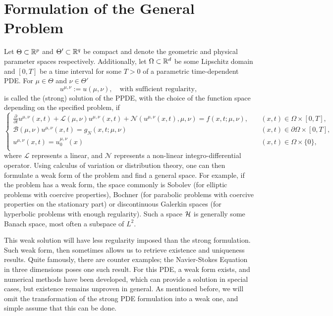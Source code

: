 \chapter{Formulation of the General Problem} \label{chapter: problem}


Let $\Theta \subset \mathbb{R}^{p}$ and $\Theta' \subset \mathbb{R}^q$ be compact and denote the geometric and physical parameter spaces 
respectively. 
Additionally, let $\Omega \subset \mathbb{R}^d$ be some Lipschitz domain and $[0, T]$ be a time interval
for some $T > 0$ of a parametric time-dependent PDE.
For $\mu \in \Theta$ and $\nu \in \Theta'$
\begin{equation*}
    u^{\mu, \nu} := u(\mu, \nu), \quad \text{with sufficient regularity},
\end{equation*}
is called the (strong) solution of the PPDE, with the choice of the function space depending on the
specified problem, if
\begin{equation*}\begin{cases}
    \displaystyle
    \frac{\partial}{\partial t} u^{\mu, \nu}(x, t) + \mathcal{L}(\mu, \nu)u^{\mu, \nu}(x, t) + 
    \mathcal{N}(u^{\mu, \nu}(x, t), \mu, \nu) 
    = f(x, t; \mu, \nu), \quad &(x, t) \in \Omega \times [0, T], \\[0.8em]
    \displaystyle
    \mathcal{B}(\mu, \nu) u^{\mu, \nu}(x, t) = g_N(x, t; \mu, \nu) &(x, t) \in \partial \Omega \times [0, T], \\[0.8em]
    \displaystyle
    u^{\mu, \nu}(x, t) = u_0^{\mu, \nu}(x) &(x, t) \in \Omega \times \{0 \}, \\
\end{cases}
\end{equation*}
where $\mathcal{L}$ represents a linear, and $\mathcal{N}$ represents a non-linear integro-differential operator.
Using calculus of variation or distribution theory, 
one can then formulate a weak form of the problem and find a general space. For example, if the problem
has a weak form, the space commonly is
Sobolev (for elliptic problems with coercive properties), Bochner (for parabolic problems with coercive properties
on the stationary part) or discontinuous Galerkin spaces (for hyperbolic problems with enough regularity). 
Such a space $\mathcal{H}$ is generally some Banach space, most often a subspace of
$L^2$.

This weak solution will have less regularity imposed than the strong formulation. Such weak form, then 
sometimes allows us to retrieve existence and uniqueness results. 
Quite famously, there are counter examples; the Navier-Stokes Equation in three 
dimensions poses one such result. For this PDE, a weak form exists, and numerical methods have been developed, which
can provide a solution in special cases, but existence remains unproven in general. 
As mentioned before, we will omit the transformation
of the strong PDE formulation into a weak one, and simple assume that this can be done.

